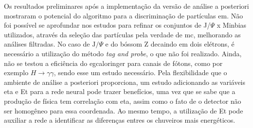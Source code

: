 Os resultados preliminares após a implementação da versão de análise
a posteriori mostraram o potencial do algoritmo para a discriminação de
partículas \gls{em}. Não foi possível se aprofundar nos estudos para refinar os
conjuntos de J/$\Psi$ x Minbias utilizados, através da seleção das partículas pela
verdade de \gls{mc}, melhorando as análises filtradas. No caso de
$\text{J}/\Psi$ e do bóssom Z decaindo em dois elétrons, é necessário a
utilização do método \emph{tag and probe}, o que não foi realizado.
Ainda, não se testou a eficiência do \gls{egcaloringer} para canais de fótons,
como por exemplo $H\rightarrow\gamma\gamma$, sendo esse um estudo necessário.
Pela flexibilidade que o ambiente de análise a posteriori proporciona, um estudo
adicionando as variáveis \gls{eta} e \gls{Et} para a rede neural pode trazer
benefícios, uma vez que se sabe que a produção de física tem correlação com
\gls{eta}, assim como o fato de o detector não ser homogêneo para essa coordenada.
Ao mesmo tempo, a utilização de \gls{Et} pode auxiliar a rede a identificar as
diferenças entres os chuveiros mais energéticos.



